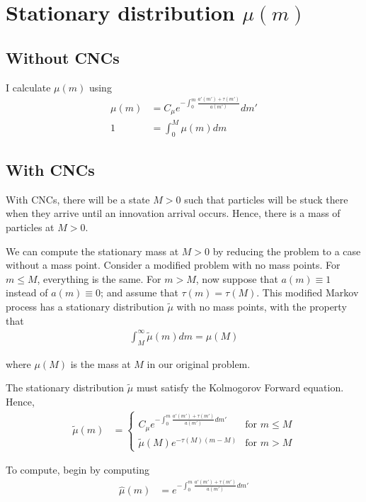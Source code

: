 \documentclass[12pt,english]{article}
\theoremstyle{remark}
\begin{document}
\section{Stationary distribution $\mu(m)$}

\subsection{Without CNCs}

I calculate $\mu(m)$ using 
\begin{align*}
	\mu(m) &= C_{\mu} e^{-\int_0^m \frac{a'(m') + \tau(m')}{a(m')}}dm' \\
	1 &= \int_0^{M} \mu(m)dm
\end{align*}

\subsection{With CNCs}

With CNCs, there will be a state $M > 0$ such that particles will be stuck there when they arrive until an innovation arrival occurs. Hence, there is a mass of particles at $M > 0$. 

We can compute the stationary mass at $M > 0$ by reducing the problem to a case without a mass point. Consider a modified problem with no mass points. For $m \le M$, everything is the same. For $m > M$, now suppose that $a(m) \equiv 1$ instead of $a(m) \equiv 0$; and assume that $\tau(m) = \tau(M)$. This modified Markov process has a stationary distribution $\tilde{\mu}$ with no mass points, with the property that 
\begin{align*}
\int_M^{\infty} \tilde{\mu}(m) dm = \mu(M)
\end{align*}

where $\mu(M)$ is the mass at $M$ in our original problem. 

The stationary distribution $\tilde{\mu}$ must satisfy the Kolmogorov Forward equation. Hence, 
\begin{align*}
\tilde{\mu}(m) &= \begin{cases}
C_{\mu} e^{-\int_0^m \frac{a'(m') + \tau(m')}{a(m')}dm'} &\textrm{for $m \le M$} \\
\tilde{\mu}(M) e^{-\tau(M)(m-M)} &\textrm{for $m > M$}
\end{cases}
\end{align*}

To compute, begin by computing 
\begin{align*}
\hat{\mu}(m) &= e^{-\int_0^m \frac{a'(m') + \tau(m')}{a(m')}dm'}
\end{align*}
\end{document}

